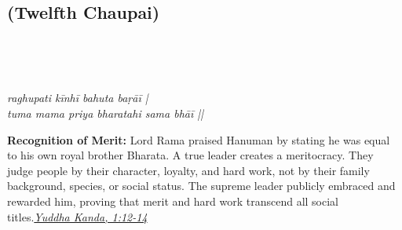 
\newpage

\subsection*{ (Twelfth Chaupai)}

\begin{minipage}[t]{0.55\textwidth}
\vspace{0pt}

{\large \linespread{1.5}\selectfont
{}\\
\par}

\vspace{0.5em}

{\large \linespread{1.5}\selectfont
{}\\
\par}

\vspace{0.5em}

{\large \linespread{1.3}\selectfont
\textit{raghupati kīnhī bahuta baṛāī |}\\
\textit{tuma mama priya bharatahi sama bhāī ||}
\par}
\end{minipage}%
\hfill
\begin{minipage}[t]{0.42\textwidth}
\vspace{0pt}
\begin{tcolorbox}[anchorbox]
\textbf{Recognition of Merit:} Lord Rama praised Hanuman by stating he was equal to his own royal brother Bharata. A true leader creates a meritocracy. They judge people by their character, loyalty, and hard work, not by their family background, species, or social status.
\vspace{0.5em}\newline The supreme leader publicly embraced and rewarded him, proving that merit and hard work transcend all social titles.\newline\null\hfill\href{https://www.valmiki.iitk.ac.in/sloka?field_kanda_tid=6&language=dv&field_sarga_value=1}{\textit{Yuddha Kanda, 1:12-14}}
\end{tcolorbox}
\end{minipage}

\vspace{0.5em}
